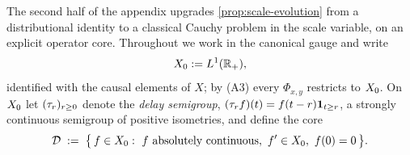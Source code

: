 %
%
%
%

The second half of the appendix upgrades \ref{prop:scale-evolution} from a distributional identity to a classical
Cauchy problem in the scale variable, on an explicit operator core. Throughout we work in the
canonical gauge and write
\[
  X_0 := L^1(\mathbb{R}_+),
\]
identified with the causal elements of $X$; by (A3) every $\Phi_{x,y}$ restricts to $X_0$. On
$X_0$ let $(\tau_r)_{r \ge 0}$ denote the \emph{delay semigroup},
$(\tau_r f)(t) = f(t - r)\mathbf{1}_{t \ge r}$, a strongly continuous semigroup of positive
isometries, and define the core
\[
  \mathcal{D} \;:=\; \bigl\{\, f \in X_0 :\ f \text{ absolutely continuous},\ f' \in X_0,\ f(0) = 0 \,\bigr\}.
\]

